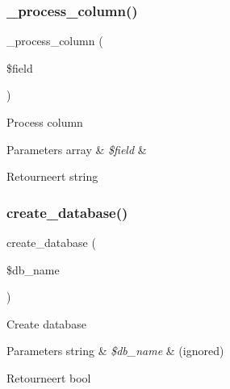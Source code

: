 \subsubsection{\texorpdfstring{\_process\_column()}{\_process\_column()}}
{\footnotesize\ttfamily \+\_\+process\+\_\+column (\begin{DoxyParamCaption}\item[{}]{\$field }\end{DoxyParamCaption})\hspace{0.3cm}{\ttfamily [protected]}}

Process column


\begin{DoxyParams}[1]{Parameters}
array & {\em \$field} & \\
\hline
\end{DoxyParams}
\begin{DoxyReturn}{Retourneert}
string 
\end{DoxyReturn}
\mbox{\label{class_c_i___d_b__pdo__sqlite__forge_a902a7267babceb2ce595706f217e00ad}} 
\subsubsection{\texorpdfstring{create\_database()}{create\_database()}}
{\footnotesize\ttfamily create\+\_\+database (\begin{DoxyParamCaption}\item[{}]{\$db\+\_\+name }\end{DoxyParamCaption})}

Create database


\begin{DoxyParams}[1]{Parameters}
string & {\em \$db\+\_\+name} & (ignored) \\
\hline
\end{DoxyParams}
\begin{DoxyReturn}{Retourneert}
bool 
\end{DoxyReturn}
\mbox{\label{class_c_i___d_b__pdo__sqlite__forge_a9612987b2d4230de2638d15857e92e67}} 
